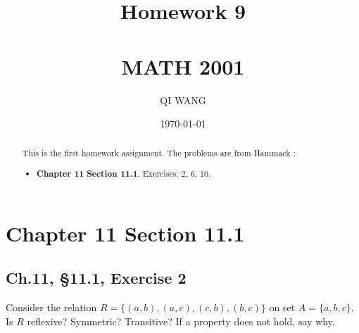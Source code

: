 \documentclass[12pt]{amsart}
\numberwithin{equation}{section}
\theoremstyle{definition}
\theoremstyle{remark}
\begin{document}




\author[QI]{QI WANG}
\address{University of Colorado, Department of Mathematics,  Campus Box 395,
Boulder, CO 80309-0395}
\date{\today}



\title[Homework 9]{Homework 9 \\ \ \\  MATH 2001}

\begin{abstract} 
This is the first homework assignment.  The problems are from Hammack \cite[Ch.~11, \S 11.1]{H13}:
\begin{itemize}

\item \textbf{Chapter 11}  
\textbf{Section 11.1}, Exercises:  2, 6, 10.

\end{itemize}
\end{abstract}


\maketitle


\tableofcontents





\section*{Chapter 11 Section 11.1}



\subsection*{Ch.11, \S 11.1,  Exercise 2}  Consider the relation $ R = \{(a, b), (a, c), (c, b), (b, c) \} $ on set $ A = \{a, b ,c \} $. Is $ R $ reflexive? Symmetric? Transitive? If a property does not hold, say why.
\end{document}
